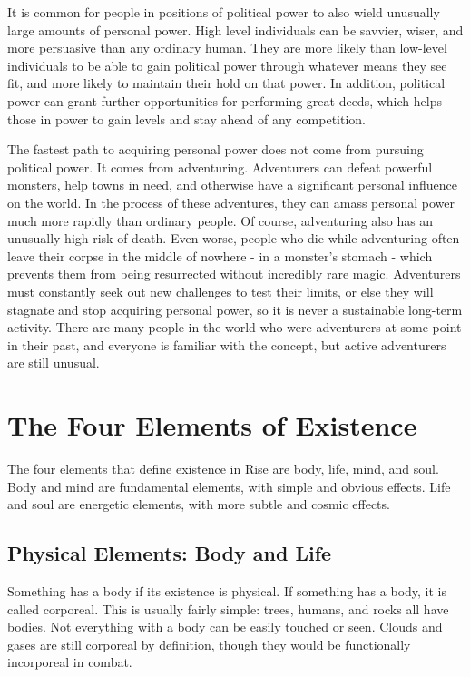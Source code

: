    It is common for people in positions of political power to also wield unusually large amounts of personal power.
    High level individuals can be savvier, wiser, and more persuasive than any ordinary human.
    They are more likely than low-level individuals to be able to gain political power through whatever means they see fit, and more likely to maintain their hold on that power.
    In addition, political power can grant further opportunities for performing great deeds, which helps those in power to gain levels and stay ahead of any competition.

    The fastest path to acquiring personal power does not come from pursuing political power.
    It comes from adventuring.
    Adventurers can defeat powerful monsters, help towns in need, and otherwise have a significant personal influence on the world.
    In the process of these adventures, they can amass personal power much more rapidly than ordinary people.
    Of course, adventuring also has an unusually high risk of death.
    Even worse, people who die while adventuring often leave their corpse in the middle of nowhere - in a monster's stomach - which prevents them from being resurrected without incredibly rare magic.
    Adventurers must constantly seek out new challenges to test their limits, or else they will stagnate and stop acquiring personal power, so it is never a sustainable long-term activity.
    There are many people in the world who were adventurers at some point in their past, and everyone is familiar with the concept, but active adventurers are still unusual.

\section{The Four Elements of Existence}

    The four elements that define existence in Rise are body, life, mind, and soul.
    Body and mind are fundamental elements, with simple and obvious effects.
    Life and soul are energetic elements, with more subtle and cosmic effects.

    \subsection{Physical Elements: Body and Life}
        Something has a body if its existence is physical.
        If something has a body, it is called corporeal.
        This is usually fairly simple: trees, humans, and rocks all have bodies.
        Not everything with a body can be easily touched or seen.
        Clouds and gases are still corporeal by definition, though they would be functionally incorporeal in combat.

